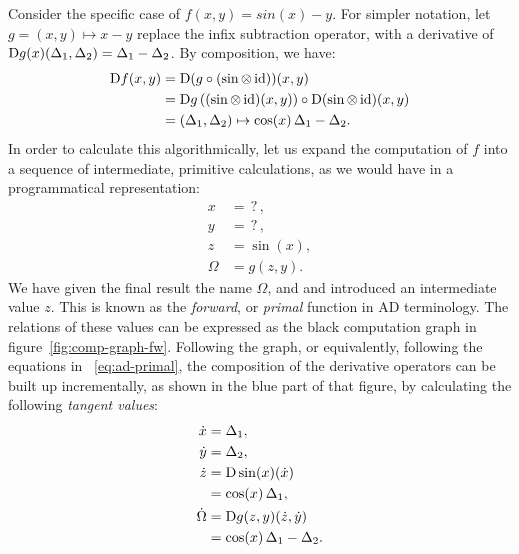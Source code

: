 Consider the specific case of \(f(x, y) = sin(x) - y\). For simpler notation, let
\(g = (x, y) \mapsto x - y\) replace the infix subtraction operator, with a derivative of
\(\mathop{}\!\mathrm{D} g(x)(\Delta_1, \Delta_2) = \Delta_1 - \Delta_2\).  By composition, we have:
\begin{equation}
  \begin{aligned}
    \mathop{}\!\mathrm{D} f(x, y) &= \mathop{}\!\mathrm{D}(g \circ (\sin \otimes \operatorname{id}))(x, y) \\
    &= \mathop{}\!\mathrm{D} g\left( (\sin \otimes \operatorname{id})(x, y) \right) \circ \mathop{}\!\mathrm{D}(\sin \otimes \operatorname{id})(x, y) \\
    &= (\Delta_1, \Delta_2) \mapsto \cos(x) \, \Delta_1 - \Delta_2.
  \end{aligned}
\end{equation}
In order to calculate this algorithmically, let us expand the computation of \(f\) into a sequence
of intermediate, primitive calculations, as we would have in a programmatical representation:
\begin{equation}
  \label{eq:ad-primal}
  \begin{aligned}
    x &= \operatorname{?}, \\
    y &= \operatorname{?}, \\
    z &= \sin(x), \\
    \Omega &= g(z, y).
  \end{aligned}
\end{equation}
We have given the final result the name \(\Omega\), and and introduced an intermediate value \(z\).
This is known as the \emph{forward}, or \emph{primal} function in AD terminology.  The relations of
these values can be expressed as the black computation graph in figure~\ref{fig:comp-graph-fw}.
Following the graph, or equivalently, following the equations in ~\eqref{eq:ad-primal}, the
composition of the derivative operators can be built up incrementally, as shown in the blue part of
that figure, by calculating the following \emph{tangent values}:
\begin{equation}
  \label{eq:ad-forward}
  \begin{aligned}
    \dot{x} &= \Delta_1, \\
    \dot{y} &= \Delta_2, \\
    \dot{z} &= \mathop{}\!\mathrm{D}\sin(x)(\dot{x}) \\
    &= \cos(x) \, \Delta_1, \\
    \dot{\Omega} &= \mathop{}\!\mathrm{D} g(z, y)(\dot{z}, \dot{y}) \\
    &= \cos(x) \, \Delta_1 - \Delta_2.
  \end{aligned}
\end{equation}
